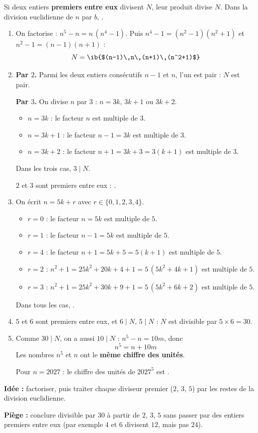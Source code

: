 \begin{prop}[Divisibilité]
Si deux entiers \textbf{premiers entre eux} divisent $N$, leur produit divise $N$. Dans la division euclidienne de $n$ par $b$, .
\end{prop}
\begin{enumerate}
  \item On factorise : $n^5-n=n\,(n^4-1)$. Puis $n^4-1=(n^2-1)(n^2+1)$ et $n^2-1=(n-1)(n+1)$ :
  \[N=\ib{$(n-1)\,n\,(n+1)\,(n^2+1)$}\]

  \item \textbf{Par $2$.} Parmi les deux entiers consécutifs $n-1$ et $n$, l'un est pair : $N$ est pair.

  \textbf{Par $3$.} On divise $n$ par $3$ : $n=3k$, $3k+1$ ou $3k+2$.

  \begin{itemize}
    \item $n=3k$ : le facteur $n$ est multiple de $3$.
    \item $n=3k+1$ : le facteur $n-1=3k$ est multiple de $3$.
    \item $n=3k+2$ : le facteur $n+1=3k+3=3(k+1)$ est multiple de $3$.
  \end{itemize}
  Dans les trois cas, $3\mid N$.

  $2$ et $3$ sont premiers entre eux : .

  \item On écrit $n=5k+r$ avec $r\in\{0,1,2,3,4\}$.

  \begin{itemize}
    \item $r=0$ : le facteur $n=5k$ est multiple de $5$.
    \item $r=1$ : le facteur $n-1=5k$ est multiple de $5$.
    \item $r=4$ : le facteur $n+1=5k+5=5(k+1)$ est multiple de $5$.
    \item $r=2$ : $n^2+1=25k^2+20k+4+1=5\,(5k^2+4k+1)$ est multiple de $5$.
    \item $r=3$ : $n^2+1=25k^2+30k+9+1=5\,(5k^2+6k+2)$ est multiple de $5$.
  \end{itemize}
  Dans tous les cas, .

  \item $5$ et $6$ sont premiers entre eux, et $6\mid N$, $5\mid N$ : $N$ est divisible par $5\times6=\boxed{30}$.

  \item Comme $30\mid N$, on a aussi $10\mid N$ : $n^5-n=10m$, donc
  \[n^5=n+10m\]
  Les nombres $n^5$ et $n$ ont le \textbf{même chiffre des unités}.

  Pour $n=2027$ : le chiffre des unités de $2027^5$ est .
\end{enumerate}
\textbf{Idée :} factoriser, puis traiter chaque diviseur premier ($2$, $3$, $5$) par les restes de la division euclidienne.

\textbf{Piège :} conclure \og divisible par $30$ \fg{} à partir de $2$, $3$, $5$ sans passer par des entiers premiers entre eux (par exemple $4$ et $6$ divisent $12$, mais pas $24$).
